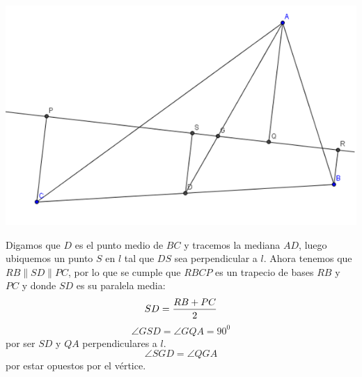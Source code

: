 \documentclass{book}
\begin{document}
\begin{enumerate}
\begin{center}
            \includegraphics[scale=1]{imagenes/Geometria/5.png}
        \end{center}
        Digamos que $D$ es el punto medio de $BC$ y tracemos la mediana $AD$, luego ubiquemos un punto $S$ en $l$ tal que $DS$ sea perpendicular a $l$. Ahora tenemos que $RB\parallel SD\parallel PC$, por lo que se cumple que $RBCP$ es un trapecio de bases $RB$ y $PC$ y donde $SD$ es su paralela media:
        $$SD={RB+PC\over 2}$$
        $$\angle GSD=\angle GQA={90} ^0$$
        por ser $SD$ y $QA$ perpendiculares a $l$.
        $$\angle SGD=\angle QGA$$
        por estar opuestos por el vértice.\\


\end{enumerate}
\end{document}
